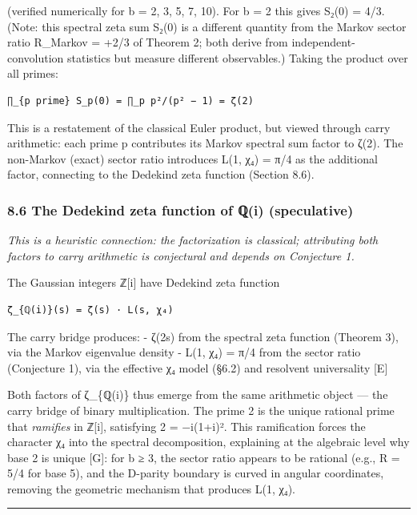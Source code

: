 \documentclass[
  11pt,
]{article}
\begin{document}
(verified numerically for b = 2, 3, 5, 7, 10). For b = 2 this gives S₂(0) = 4/3.
(Note: this spectral zeta sum S₂(0) is a different quantity from the Markov
sector ratio R\_Markov = +2/3 of Theorem 2; both derive from
independent-convolution statistics but measure different observables.) Taking
the product over all primes:

\begin{verbatim}
∏_{p prime} S_p(0) = ∏_p p²/(p² − 1) = ζ(2)
\end{verbatim}

This is a restatement of the classical Euler product, but viewed through carry
arithmetic: each prime p contributes its Markov spectral sum factor to ζ(2). The
non-Markov (exact) sector ratio introduces L(1, χ₄) = π/4 as the additional
factor, connecting to the Dedekind zeta function (Section 8.6).

\subsubsection{8.6 The Dedekind zeta function of ℚ(i)
(speculative)}\label{the-dedekind-zeta-function-of-ux211ai-speculative}

\emph{This is a heuristic connection: the factorization is classical;
attributing both factors to carry arithmetic is conjectural and depends on
Conjecture 1.}

The Gaussian integers ℤ{[}i{]} have Dedekind zeta function

\begin{verbatim}
ζ_{ℚ(i)}(s) = ζ(s) · L(s, χ₄)
\end{verbatim}

The carry bridge produces: - ζ(2s) from the spectral zeta function (Theorem 3),
via the Markov eigenvalue density - L(1, χ₄) = π/4 from the sector ratio
(Conjecture 1), via the effective χ₄ model (§6.2) and resolvent universality
{[}E{]}

Both factors of ζ\_\{ℚ(i)\} thus emerge from the same arithmetic object --- the
carry bridge of binary multiplication. The prime 2 is the unique rational prime
that \emph{ramifies} in ℤ{[}i{]}, satisfying 2 = −i(1+i)². This ramification
forces the character χ₄ into the spectral decomposition, explaining at the
algebraic level why base 2 is unique {[}G{]}: for b ≥ 3, the sector ratio
appears to be rational (e.g., R = 5/4 for base 5), and the D-parity boundary is
curved in angular coordinates, removing the geometric mechanism that produces
L(1, χ₄).

\begin{center}\rule{0.5\linewidth}{0.5pt}\end{center}
\end{document}
